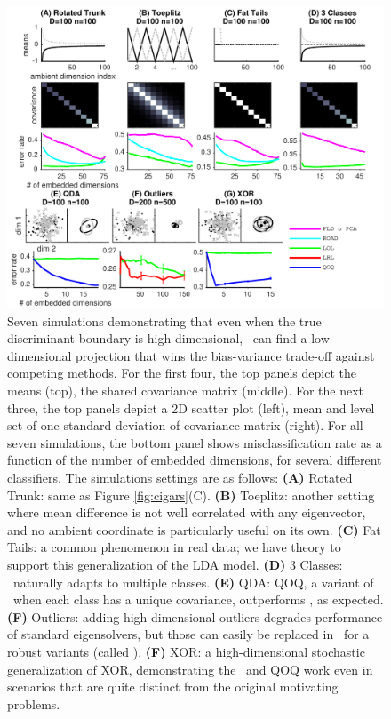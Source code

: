 \documentclass[10pt]{article}
\begin{document}
\begin{figure}[h!]
\centering
\includegraphics[width=1\linewidth]{../Figs/properties.pdf}
\caption{
Seven simulations demonstrating that even when the true discriminant boundary is high-dimensional, \Lol~can find a low-dimensional projection that wins the bias-variance trade-off against competing methods.  
For the first four, the top panels depict the means (top), the shared covariance matrix (middle).  For the next three, the top panels depict a 2D scatter plot (left), mean and level set of one standard deviation of covariance matrix (right).  For all seven simulations, the bottom panel shows misclassification rate as a function of the number of embedded dimensions, for several different classifiers.  The simulations settings are as follows:
\textbf{(A)} Rotated Trunk: same as Figure \ref{fig:cigars}(C).
\textbf{(B)} Toeplitz: another setting where mean difference is not well correlated with any eigenvector, and no ambient coordinate is particularly useful on its own.
\textbf{(C)} Fat Tails: a common phenomenon in real data; we have theory to support this generalization of the LDA model.
\textbf{(D)} 3 Classes: \Lol~naturally adapts to multiple classes.
\textbf{(E)} QDA: QOQ, a variant of \Lol~when each class has a unique covariance, outperforms \Lol, as expected.
\textbf{(F)} Outliers: adding high-dimensional outliers degrades performance of standard eigensolvers, but those can easily be replaced in \Lol~for a robust variants (called \Lrl).
\textbf{(F)} XOR: a high-dimensional stochastic generalization of XOR, demonstrating the \Lol~and QOQ work even in scenarios that are quite distinct from the original motivating problems.
}
\end{figure}
\end{document}
